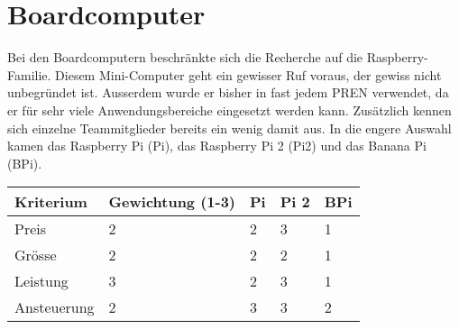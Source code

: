 \section{Boardcomputer}

Bei den Boardcomputern beschränkte sich die Recherche auf die Raspberry-Familie.
Diesem Mini-Computer geht ein gewisser Ruf voraus, der gewiss nicht unbegründet ist.
Ausserdem wurde er bisher in fast jedem PREN verwendet, da er für sehr viele Anwendungsbereiche eingesetzt werden kann.
Zusätzlich kennen sich einzelne Teammitglieder bereits ein wenig damit aus.
In die engere Auswahl kamen das Raspberry Pi (Pi), das Raspberry Pi 2 (Pi2) und das Banana Pi (BPi).


\begin{table}[h]
\begin{tabular}{|p{4.5cm}|p{3.5cm}|p{2cm}|p{2cm}|p{2cm}|}\hline
	
	\textbf{Kriterium}	& 	\textbf{Gewichtung (1-3)} & \textbf{Pi} & \textbf{Pi 2} & \textbf{BPi}\\\hline
	{Preis}	& 	{2} & {2} & {3} & {1}\\\hline
	{Grösse}	& 	{2} & {2} & {2} & {1}\\\hline
	{Leistung}	& 	{3} & {2} & {3} & {1}\\\hline
	{Ansteuerung}	& 	{2} & {3} & {3} & {2}\\\hline
	
	
	
	
\end{tabular}\\
\end{table}